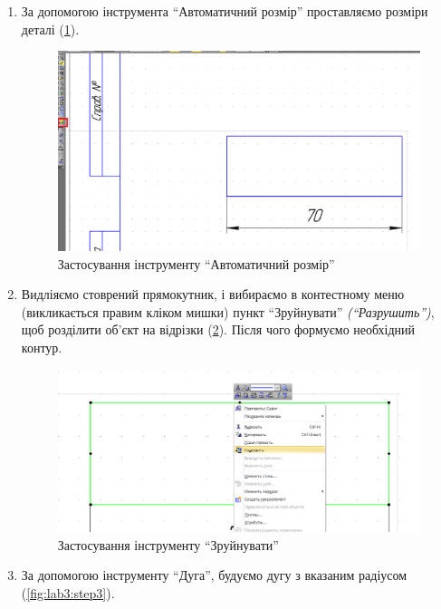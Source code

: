 \begin{enumerate}[leftmargin=*]
\item За допомогою інструмента ``Автоматичний розмір'' проставляємо розміри деталі (\ref{fig:lab3:dimentions}).
    \begin{figure}[!ht]
      \centering
      \includegraphics[width=0.9\linewidth]{./images/lab3/step2.png}
      \caption{Застосування інструменту ``Автоматичний розмір''}
      \label{fig:lab3:dimentions} 
    \end{figure}
  \item Видліяємо стоврений прямокутник, і вибираємо в контестному меню (викликається правим кліком
    мишки) пункт ``Зруйнувати'' \textit{(``Разрушить'')}, щоб розділити об’єкт на
    відрізки (\ref{fig:lab3:dismantle}). Після чого формуємо необхідний контур.
    \begin{figure}[!ht]
      \centering
      \includegraphics[width=0.9\linewidth]{./images/lab3/step3.png}
      \caption{Застосування інструменту ``Зруйнувати''}
      \label{fig:lab3:dismantle} 
    \end{figure}
  \item За допомогою інструменту ``Дуга'', будуємо дугу з вказаним радіусом (\ref{fig:lab3:step3}).
        \begin{figure}[!ht]
          \centering

\end{figure}
\end{enumerate}
